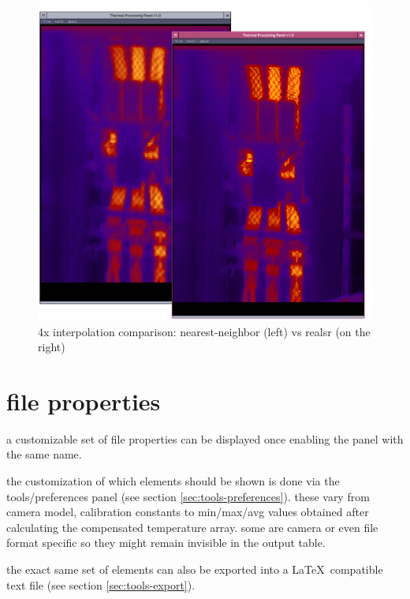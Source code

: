 \documentclass[12pt,twoside,a4paper,notitlepage]{report}
\begin{document}
\begin{figure}[ht]
 \centering
 \includegraphics[width=14cm, keepaspectratio=true]{img/zoom_interpolation}
 \caption{4x interpolation comparison: nearest-neighbor (left) vs realsr (on the right)}
 \label{fig:relasr interpolation}
\end{figure}


\section{file properties} \label{sec:file-properties}

a customizable set of file properties can be displayed once enabling the panel with the same name.

the customization of which elements should be shown is done via the tools/preferences panel (see section \ref{sec:tools-preferences}). these vary from camera model, calibration constants to min/max/avg values obtained after calculating the compensated temperature array. some are camera or even file format specific so they might remain invisible in the output table.

the exact same set of elements can also be exported into a \LaTeX \ compatible text file (see section \ref{sec:tools-export}).
\end{document}
